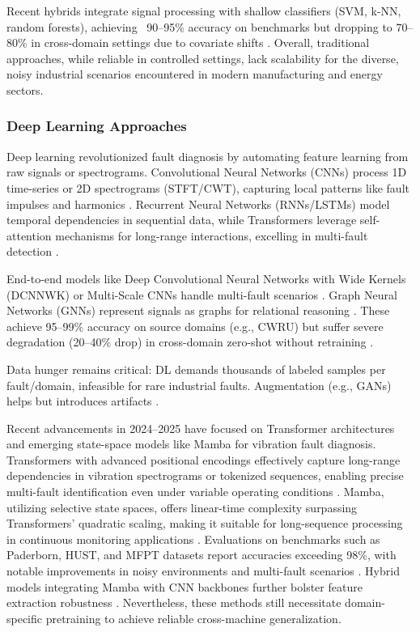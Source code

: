 Recent hybrids integrate signal processing with shallow classifiers (SVM, k-NN, random forests), achieving ~90--95\% accuracy on benchmarks but dropping to 70--80\% in cross-domain settings due to covariate shifts \cite{li2021mmd}. Overall, traditional approaches, while reliable in controlled settings, lack scalability for the diverse, noisy industrial scenarios encountered in modern manufacturing and energy sectors.

\subsubsection{Deep Learning Approaches}
Deep learning revolutionized fault diagnosis by automating feature learning from raw signals or spectrograms. Convolutional Neural Networks (CNNs) process 1D time-series or 2D spectrograms (STFT/CWT), capturing local patterns like fault impulses and harmonics \cite{jia2016deep,verstraete2020cnn}. Recurrent Neural Networks (RNNs/LSTMs) model temporal dependencies in sequential data, while Transformers leverage self-attention mechanisms for long-range interactions, excelling in multi-fault detection \cite{li2022transformer}.

End-to-end models like Deep Convolutional Neural Networks with Wide Kernels (DCNNWK) or Multi-Scale CNNs handle multi-fault scenarios \cite{wen2022maml}. Graph Neural Networks (GNNs) represent signals as graphs for relational reasoning \cite{li2023gnn}. These achieve 95--99\% accuracy on source domains (e.g., CWRU) but suffer severe degradation (20--40\% drop) in cross-domain zero-shot without retraining \cite{wang2020transfer,hoang2023vit}.

Data hunger remains critical: DL demands thousands of labeled samples per fault/domain, infeasible for rare industrial faults. Augmentation (e.g., GANs) helps but introduces artifacts \cite{hoang2023vit}.

Recent advancements in 2024--2025 have focused on Transformer architectures and emerging state-space models like Mamba for vibration fault diagnosis. Transformers with advanced positional encodings effectively capture long-range dependencies in vibration spectrograms or tokenized sequences, enabling precise multi-fault identification even under variable operating conditions \cite{chen2024transformer}. Mamba, utilizing selective state spaces, offers linear-time complexity surpassing Transformers' quadratic scaling, making it suitable for long-sequence processing in continuous monitoring applications \cite{li2024mamba}. Evaluations on benchmarks such as Paderborn, HUST, and MFPT datasets report accuracies exceeding 98\%, with notable improvements in noisy environments and multi-fault scenarios \cite{aziz2025mamba}. Hybrid models integrating Mamba with CNN backbones further bolster feature extraction robustness \cite{guo2025hybrid}. Nevertheless, these methods still necessitate domain-specific pretraining to achieve reliable cross-machine generalization.

